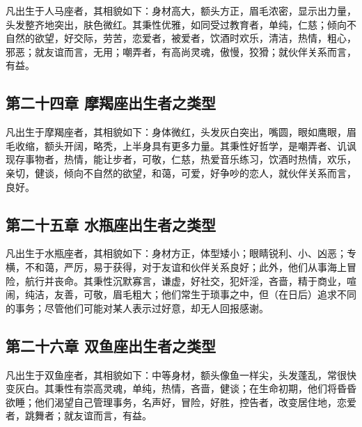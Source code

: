 凡出生于人马座者，其相貌如下：身材高大，额头方正，眉毛浓密，显示出力量，头发整齐地突出，肤色微红。其秉性优雅，如同受过教育者，单纯，仁慈；倾向不自然的欲望，好交际，劳苦，恋爱者，被爱者，饮酒时欢乐，清洁，热情，粗心，邪恶；就友谊而言，无用；嘲弄者，有高尚灵魂，傲慢，狡猾；就伙伴关系而言，有益。\par


\subsection{第二十四章 摩羯座出生者之类型}

凡出生于摩羯座者，其相貌如下：身体微红，头发灰白突出，嘴圆，眼如鹰眼，眉毛收缩，额头开阔，略秃，上半身具有更多力量。其秉性好哲学，是嘲弄者、讥讽现存事物者，热情，能让步者，可敬，仁慈，热爱音乐练习，饮酒时热情，欢乐，亲切，健谈，倾向不自然的欲望，和蔼，可爱，好争吵的恋人，就伙伴关系而言，良好。\par


\subsection{第二十五章 水瓶座出生者之类型}

凡出生于水瓶座者，其相貌如下：身材方正，体型矮小；眼睛锐利、小、凶恶；专横，不和蔼，严厉，易于获得，对于友谊和伙伴关系良好；此外，他们从事海上冒险，航行并丧命。其秉性沉默寡言，谦虚，好社交，犯奸淫，吝啬，精于商业，喧闹，纯洁，友善，可敬，眉毛粗大；他们常生于琐事之中，但（在日后）追求不同的事务；尽管他们可能对某人表示过好意，却无人回报感谢。\par


\subsection{第二十六章 双鱼座出生者之类型}

凡出生于双鱼座者，其相貌如下：中等身材，额头像鱼一样尖，头发蓬乱，常很快变灰白。其秉性有崇高灵魂，单纯，热情，吝啬，健谈；在生命初期，他们将昏昏欲睡；他们渴望自己管理事务，名声好，冒险，好胜，控告者，改变居住地，恋爱者，跳舞者；就友谊而言，有益。\par

